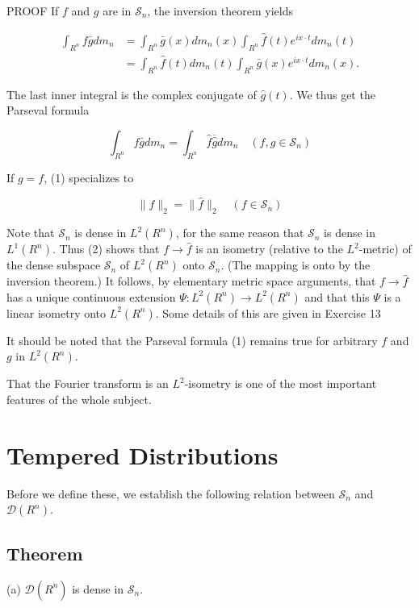 \documentclass[10pt]{article}
\begin{document}
PROOF If $f$ and $g$ are in $\mathscr{S}_{n}$, the inversion theorem yields

$$
\begin{aligned}
\int_{R^{n}} f \bar{g} d m_{n} & =\int_{R^{n}} \bar{g}(x) d m_{n}(x) \int_{R^{n}} \hat{f}(t) e^{i x \cdot t} d m_{n}(t) \\
& =\int_{R^{n}} \hat{f}(t) d m_{n}(t) \int_{R^{n}} \bar{g}(x) e^{i x \cdot t} d m_{n}(x) .
\end{aligned}
$$

The last inner integral is the complex conjugate of $\hat{g}(t)$. We thus get the Parseval formula

$$
\int_{R^{n}} f \bar{g} d m_{n}=\int_{R^{n}} \hat{f} \overline{\hat{g}} d m_{n} \quad\left(f, g \in \mathscr{S}_{n}\right)
$$

If $g=f$, (1) specializes to

$$
\|f\|_{2}=\|\hat{f}\|_{2} \quad\left(f \in \mathscr{S}_{n}\right)
$$

Note that $\mathscr{S}_{n}$ is dense in $L^{2}\left(R^{n}\right)$, for the same reason that $\mathscr{S}_{n}$ is dense in $L^{1}\left(R^{n}\right)$. Thus (2) shows that $f \rightarrow \hat{f}$ is an isometry (relative to the $L^{2}$-metric) of the dense subspace $\mathscr{S}_{n}$ of $L^{2}\left(R^{n}\right)$ onto $\mathscr{S}_{n}$. (The mapping is onto by the inversion theorem.) It follows, by elementary metric space arguments, that $f \rightarrow \hat{f}$ has a unique continuous extension $\Psi: L^{2}\left(R^{n}\right) \rightarrow L^{2}\left(R^{n}\right)$ and that this $\Psi$ is a linear isometry onto $L^{2}\left(R^{n}\right)$. Some details of this are given in Exercise 13

It should be noted that the Parseval formula (1) remains true for arbitrary $f$ and $g$ in $L^{2}\left(R^{n}\right)$.

That the Fourier transform is an $L^{2}$-isometry is one of the most important features of the whole subject.

\section{Tempered Distributions}
Before we define these, we establish the following relation between $\mathscr{S}_{n}$ and $\mathscr{D}\left(R^{n}\right)$.

\subsection{Theorem}
(a) $\mathscr{D}\left(R^{\dot{n}}\right)$ is dense in $\mathscr{S}_{n}$.
\end{document}
